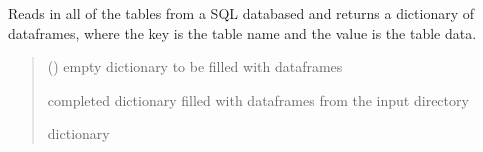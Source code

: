 \documentclass[letterpaper,10pt,english]{sphinxmanual}
\begin{document}

\begin{fulllineitems}
\label{\detokenize{src.models.electricity.scripts.preprocessor:src.models.electricity.scripts.preprocessor.readin_sql}}
\pysigstartsignatures
\pysiglinewithargsret
{}
{}
{}
\pysigstopsignatures
\sphinxAtStartPar
Reads in all of the tables from a SQL databased and returns a dictionary of dataframes,
where the key is the table name and the value is the table data.
\begin{quote}\begin{description}
\sphinxAtStartPar
{} () \textendash{} empty dictionary to be filled with dataframes

\sphinxAtStartPar
completed dictionary filled with dataframes from the input directory

\sphinxAtStartPar
dictionary

\end{description}\end{quote}

\end{fulllineitems}

\end{document}
